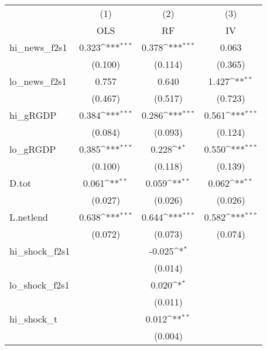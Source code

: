 {
\def\sym#1{\ifmmode^{#1}\else\(^{#1}\)\fi}
\begin{tabular}{l*{3}{c}}
\toprule
            &\multicolumn{1}{c}{(1)}&\multicolumn{1}{c}{(2)}&\multicolumn{1}{c}{(3)}\\
            &\multicolumn{1}{c}{OLS}&\multicolumn{1}{c}{RF}&\multicolumn{1}{c}{IV}\\
\midrule
hi\_news\_f2s1&       0.323\sym{***}&       0.378\sym{***}&       0.063         \\
            &     (0.100)         &     (0.114)         &     (0.365)         \\
\addlinespace
lo\_news\_f2s1&       0.757         &       0.640         &       1.427\sym{**} \\
            &     (0.467)         &     (0.517)         &     (0.723)         \\
\addlinespace
hi\_gRGDP    &       0.384\sym{***}&       0.286\sym{***}&       0.561\sym{***}\\
            &     (0.084)         &     (0.093)         &     (0.124)         \\
\addlinespace
lo\_gRGDP    &       0.385\sym{***}&       0.228\sym{*}  &       0.550\sym{***}\\
            &     (0.100)         &     (0.118)         &     (0.139)         \\
\addlinespace
D.tot       &       0.061\sym{**} &       0.059\sym{**} &       0.062\sym{**} \\
            &     (0.027)         &     (0.026)         &     (0.026)         \\
\addlinespace
L.netlend   &       0.638\sym{***}&       0.644\sym{***}&       0.582\sym{***}\\
            &     (0.072)         &     (0.073)         &     (0.074)         \\
\addlinespace
hi\_shock\_f2s1&                     &      -0.025\sym{*}  &                     \\
            &                     &     (0.014)         &                     \\
\addlinespace
lo\_shock\_f2s1&                     &       0.020\sym{*}  &                     \\
            &                     &     (0.011)         &                     \\
\addlinespace
hi\_shock\_t  &                     &       0.012\sym{**} &                     \\
            &                     &     (0.004)         &                     \\

\end{tabular}}

